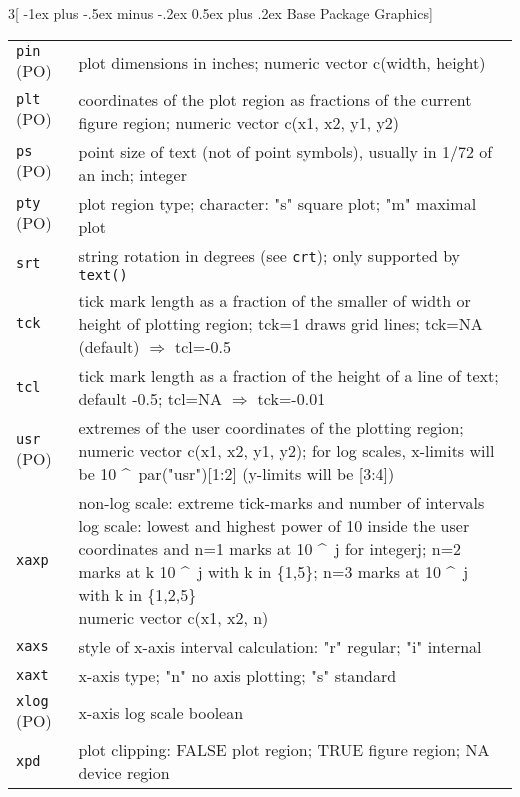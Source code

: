 \documentclass[landscape]{article}
\makeatletter
\renewcommand{\section}{\@startsection{section}{1}{0mm}%
                                {-1ex plus -.5ex minus -.2ex}%
                                {0.5ex plus .2ex}%
                                {\normalfont\large\bfseries}}
\makeatother
\begin{document}
\begin{multicols}{3}[\section{Base Package Graphics}]
\setlength{\tabcolsep}{0pt}
\setlength{\tabularwidth}{0.33\textwidth}
\setlength{\widthleftcol}{0.21\tabularwidth}
\setlength{\widthrightcol}{\tabularwidth}
\addtolength{\widthrightcol}{-\widthleftcol}
\begin{tabular}[t]{@{}p{\widthleftcol}p{\widthrightcol}@{}}
\hline
\verb|pin| (PO) & plot dimensions in inches; numeric vector c(width, height) \\
\verb|plt| (PO) & coordinates of the plot region as fractions of the current figure region; numeric vector c(x1, x2, y1, y2) \\
\verb|ps| (PO) & point size of text (not of point symbols), usually in 1/72 of an inch; integer \\
\verb|pty| (PO) & plot region type; character: "s" square plot; "m" maximal plot \\
\verb|srt| & string rotation in degrees (see \verb|crt|); only supported by \verb|text()| \\
\verb|tck| & tick mark length as a fraction of the smaller of width or height of plotting region; tck=1 draws grid lines; tck=NA (default) $\Rightarrow$ tcl=-0.5 \\
\verb|tcl| & tick mark length as a fraction of the height of a line of text; default -0.5; tcl=NA $\Rightarrow$ tck=-0.01 \\
\verb|usr| (PO) & extremes of the user coordinates of the plotting region; numeric vector c(x1, x2, y1, y2); for log scales, x-limits will be 10 \textasciicircum \ par("usr")[1:2] (y-limits will be [3:4]) \\
\verb|xaxp| & \parbox[t]{\widthrightcol}{
non-log scale: extreme tick-marks and number of intervals \\
log scale: lowest and highest power of 10 inside the user coordinates and n=1 marks at 10 \textasciicircum \ j for integerj; n=2 marks at k 10 \textasciicircum \ j with k in \{1,5\}; n=3 marks at 10 \textasciicircum \ j with k in \{1,2,5\} \\
numeric vector c(x1, x2, n)
} \\
\verb|xaxs| & style of x-axis interval calculation: "r" regular; "i" internal \\
\verb|xaxt| & x-axis type; "n" no axis plotting; "s" standard \\
\verb|xlog| (PO) & x-axis log scale boolean \\
\verb|xpd| & plot clipping: FALSE plot region; TRUE figure region; NA device region \\

\end{tabular}
\end{multicols}
\end{document}
